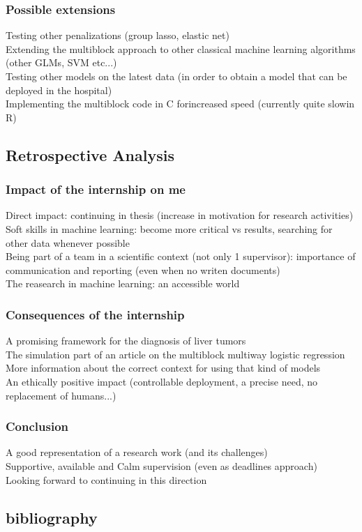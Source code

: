 \documentclass{beamer}
\begin{document}
\begin{frame}
    \frametitle{Possible extensions}
    Testing other penalizations (group lasso, elastic net)\\[10 pt]
    Extending the multiblock approach to other classical machine learning algorithms (other GLMs, SVM etc...)\\[10 pt]
    Testing other models on the latest data (in order to obtain a model that can be deployed in the hospital)\\[10 pt]
    Implementing the multiblock code in C forincreased speed (currently quite slowin R)
\end{frame}

\begin{frame}
    \section{Retrospective Analysis}
\end{frame}

\begin{frame}
    \frametitle{Impact of the internship on me}
    Direct impact: continuing in thesis (increase in motivation for research activities)\\[10 pt]
    Soft skills in machine learning: become more critical vs results, searching for other data whenever possible\\[10 pt]
    Being part of a team in a scientific context (not only 1 supervisor): importance of communication and reporting (even when no writen documents)\\[10 pt]
    The reasearch in machine learning: an accessible world
\end{frame}


\begin{frame}
    \frametitle{Consequences of the internship}
    A promising framework for the diagnosis of liver tumors\\[10 pt]
    The simulation part of an article on the multiblock multiway logistic regression\\[10 pt]
    More information about the correct context for using that kind of models\\[10 pt]
    An ethically positive impact (controllable deployment, a precise need, no replacement of humans...)
    
\end{frame}

\begin{frame}
    \frametitle{Conclusion}
    A good representation of a research work (and its challenges)\\[10 pt]
    Supportive, available and Calm supervision (even as deadlines approach)\\[10 pt]
    Looking forward to continuing in this direction
\end{frame}

\begin{frame}
\section*{bibliography}
\end{frame}


\begin{frame}[allowframebreaks] 
    
     
    \end{frame}
\end{document}
